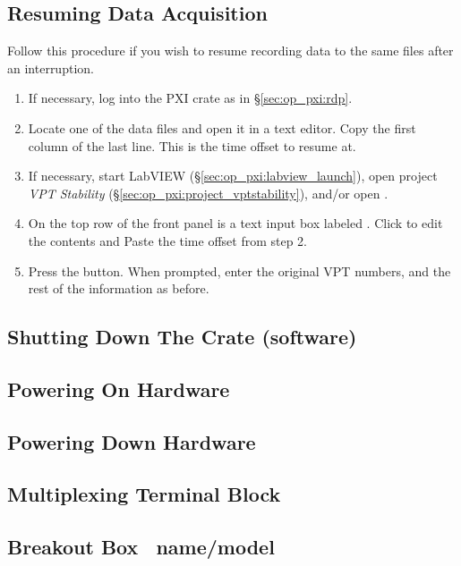 \subsection{Resuming Data Acquisition}
\label{sec:op_pxi:daq_resume}

Follow this procedure if you wish to resume recording data to the same files after an interruption.
\begin{enumerate}
\item If necessary, log into the PXI crate as in \S\ref{sec:op_pxi:rdp}.
\item Locate one of the data files and open it in a text editor.  Copy the first column of the last line.  This is the time offset to resume at.
\item If necessary, start LabVIEW (\S\ref{sec:op_pxi:labview_launch}), open project \textit{VPT Stability} (\S\ref{sec:op_pxi:project_vptstability}), and/or open .
\item On the top row of the  front panel is a text input box labeled .  Click to edit the contents and Paste the time offset from step 2.
\item Press the   button.  When prompted, enter the original VPT numbers, and the rest of the information as before.
\end{enumerate}


\subsection{Shutting Down The Crate (software)}
\label{sec:op_pxi:shutdown_software}

\subsection{Powering On Hardware}
\label{sec:op_pxi:poweron}

\subsection{Powering Down Hardware}
\label{sec:op_pxi:poweroff}

\subsection{Multiplexing Terminal Block}
\label{sec:op_pxi:tblock_disconnect}

\subsection{Breakout Box \FIXME\ name/model}
\label{sec:op_pxi:breakout}


